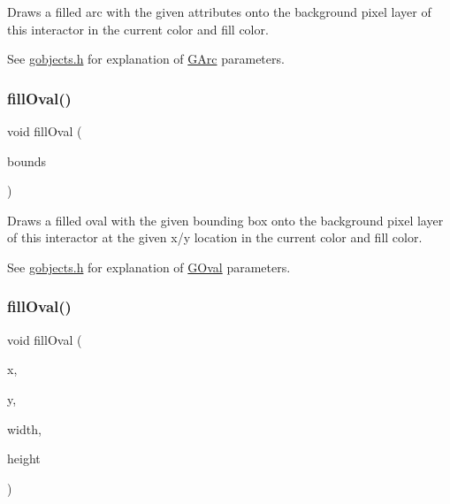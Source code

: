 Draws a filled arc with the given attributes onto the background pixel layer of this interactor in the current color and fill color. 

See \mbox{\hyperlink{gobjects_8h_source}{gobjects.\+h}} for explanation of \mbox{\hyperlink{classGArc}{G\+Arc}} parameters. \mbox{\label{classGDrawingSurface_a1ea6e48d59fb588797dba4deab1397e0}} 
\subsubsection{\texorpdfstring{fill\+Oval()}{fillOval()}\hspace{0.1cm}{\footnotesize\ttfamily [1/2]}}
{\footnotesize\ttfamily void fill\+Oval (\begin{DoxyParamCaption}\item[{const \mbox{\hyperlink{structGRectangle}{G\+Rectangle}} \&}]{bounds }\end{DoxyParamCaption})\hspace{0.3cm}{\ttfamily [virtual]}}



Draws a filled oval with the given bounding box onto the background pixel layer of this interactor at the given x/y location in the current color and fill color. 

See \mbox{\hyperlink{gobjects_8h_source}{gobjects.\+h}} for explanation of \mbox{\hyperlink{classGOval}{G\+Oval}} parameters. \mbox{\label{classGDrawingSurface_a28c700c82f31cd328a4629273420ee61}} 
\subsubsection{\texorpdfstring{fill\+Oval()}{fillOval()}\hspace{0.1cm}{\footnotesize\ttfamily [2/2]}}
{\footnotesize\ttfamily void fill\+Oval (\begin{DoxyParamCaption}\item[{double}]{x,  }\item[{double}]{y,  }\item[{double}]{width,  }\item[{double}]{height }\end{DoxyParamCaption})\hspace{0.3cm}{\ttfamily [virtual]}}



